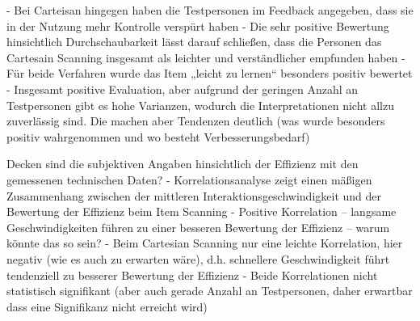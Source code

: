 -	Bei Carteisan hingegen haben die Testpersonen im Feedback angegeben, dass sie in der Nutzung mehr Kontrolle verspürt haben 
-	Die sehr positive Bewertung hinsichtlich Durchschaubarkeit lässt darauf schließen, dass die Personen das Cartesain Scanning insgesamt als leichter und verständlicher empfunden haben 
-	Für beide Verfahren wurde das Item „leicht zu lernen“ besonders positiv bewertet 
-	Insgesamt positive Evaluation, aber aufgrund der geringen Anzahl an Testpersonen gibt es hohe Varianzen, wodurch die Interpretationen nicht allzu zuverlässig sind. Die machen aber Tendenzen deutlich (was wurde besonders positiv wahrgenommen und wo besteht Verbesserungsbedarf) 

Decken sind die subjektiven Angaben hinsichtlich der Effizienz mit den gemessenen technischen Daten?
-	Korrelationsanalyse zeigt einen mäßigen Zusammenhang zwischen der mittleren Interaktionsgeschwindigkeit und der Bewertung der Effizienz beim Item Scanning
-	Positive Korrelation – langsame Geschwindigkeiten führen zu einer besseren Bewertung der Effizienz – warum könnte das so sein?
-	Beim Cartesian Scanning nur eine leichte Korrelation, hier negativ (wie es auch zu erwarten wäre), d.h. schnellere Geschwindigkeit führt tendenziell zu besserer Bewertung der Effizienz 
-	Beide Korrelationen nicht statistisch signifikant (aber auch gerade Anzahl an Testpersonen, daher erwartbar dass eine Signifikanz nicht erreicht wird)

